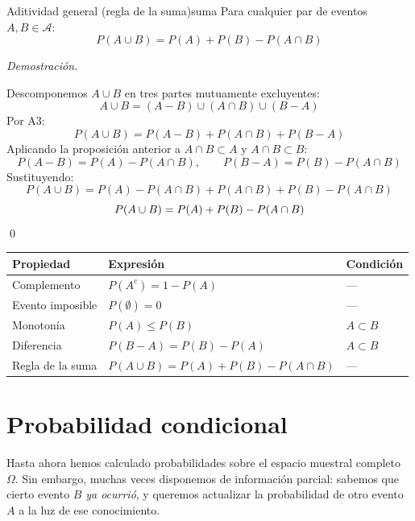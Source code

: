\documentclass[12pt, a4paper]{book}
\renewenvironment{proof}{%
    \par\medskip\noindent\textit{Demostraci\'{o}n.}\enspace
}{\qed\par\medskip}
\numberwithin{equation}{chapter}
\begin{document}
\begin{proposicion}{Aditividad general (regla de la suma)}{suma}
	Para cualquier par de eventos $A, B \in \mathcal{A}$:
	\[
	P(A \cup B) = P(A) + P(B) - P(A \cap B)
	\]
\end{proposicion}

\begin{proof}
	Descomponemos $A \cup B$ en tres partes mutuamente excluyentes:
	\[
	A \cup B = (A - B) \cup (A \cap B) \cup (B - A)
	\]
	Por A3:
	\[
	P(A \cup B) = P(A - B) + P(A \cap B) + P(B - A)
	\]
	Aplicando la proposición anterior a $A \cap B \subset A$ y 
	$A \cap B \subset B$:
	\[
	P(A - B) = P(A) - P(A \cap B), \qquad P(B - A) = P(B) - 
	P(A \cap B)
	\]
	Sustituyendo:
	\[
	P(A \cup B) = P(A) - P(A \cap B) + P(A \cap B) + P(B) - 
	P(A \cap B)
	\]
	\[
	P(A \cup B) = P(A) + P(B) - P(A \cap B) \qedhere
	\]
\end{proof}

\vspace{0.5em}
\begin{center}
	\begin{tabular}{@{}lll@{}}
		\toprule
		\textbf{Propiedad} & \textbf{Expresión} & \textbf{Condición} \\
		\midrule
		Complemento      & $P(A^c) = 1 - P(A)$                          & --- \\[6pt]
		Evento imposible & $P(\emptyset) = 0$                            & --- \\[6pt]
		Monotonía        & $P(A) \leq P(B)$                             & $A \subset B$ \\[6pt]
		Diferencia       & $P(B - A) = P(B) - P(A)$                    & $A \subset B$ \\[6pt]
		Regla de la suma & $P(A \cup B) = P(A) + P(B) - P(A \cap B)$   & --- \\
		\bottomrule
	\end{tabular}
\end{center}
\vspace{0.5em}

\section{Probabilidad condicional}

Hasta ahora hemos calculado probabilidades sobre el espacio muestral 
completo $\Omega$. Sin embargo, muchas veces disponemos de información 
parcial: sabemos que cierto evento $B$ \textit{ya ocurrió}, y queremos 
actualizar la probabilidad de otro evento $A$ a la luz de ese 
conocimiento.
\end{document}
